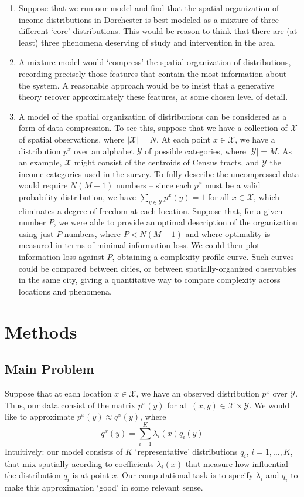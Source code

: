 \documentclass[english]{scrartcl}
\newcommand\abs[1]{\left|#1\right|}
\begin{document}
		\begin{enumerate}
			\item Suppose that we run our model and find that the spatial organization of income distributions in Dorchester is best modeled as a mixture of three different `core' distributions. This would be reason to think that there are (at least) three phenomena deserving of study and intervention in the area.
			\item A mixture model would `compress' the spatial organization of distributions, recording precisely those features that contain the most information about the system. A reasonable approach would be to insist that a generative theory recover approximately these features, at some chosen level of detail.
			\item A model of the spatial organization of distributions can be considered as a form of data compression. To see this, suppose that we have a collection of $\mathcal{X}$ of spatial observations, where $\abs{\mathcal{X}} = N$. At each point $x\in \mathcal{X}$, we have a distribution $p^x$ over an alphabet $\mathcal{Y}$ of possible categories, where $\abs{\mathcal{Y}} = M$. As an example, $\mathcal{X}$ might consist of the centroids of Census tracts, and $\mathcal{Y}$ the income categories used in the survey. To fully describe the uncompressed data would require $N(M-1)$ numbers -- since each $p^x$ must be a valid probability distribution, we have $\sum_{y\in \mathcal{Y}} p^x(y) = 1$ for all $x\in \mathcal{X}$, which eliminates a degree of freedom at each location. Suppose that, for a given number $P$, we were able to provide an optimal description of the organization using just $P$ numbers, where $P < N(M-1)$ and where optimality is measured in terms of minimal information loss. We could then plot information loss against $P$, obtaining a complexity profile curve. Such curves could be compared between cities, or between spatially-organized observables in the same city, giving a quantitative way to compare complexity across locations and phenomena.
		\end{enumerate}




\section{Methods}
	\subsection{Main Problem}
		Suppose that at each location $x \in \mathcal{X}$, we have an observed distribution $p^x$ over $\mathcal{Y}$. Thus, our data consist of the matrix $p^x(y)$ for all $(x,y) \in \mathcal{X} \times \mathcal{Y}$. We would like to approximate $p^x(y) \approx q^x(y)$, where
		\begin{equation}
			q^x(y) = \sum_{i=1}^K \lambda_i(x) q_i(y)
		\end{equation}
		Intuitively: our model consists of $K$ `representative' distributions $q_i$, $i = 1,\ldots,K$, that mix spatially acording to coefficients $\lambda_i(x)$ that measure how influential the distribution $q_i$ is at point $x$. Our computational task is to specify $\lambda_i$ and $q_i$ to make this approximation `good' in some relevant sense.
\end{document}
